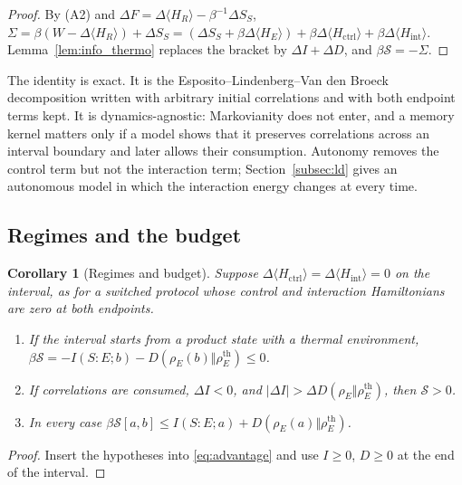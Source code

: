 \documentclass[12pt]{article}
\newtheorem{corollary}[theorem]{Corollary}
\begin{document}
\begin{proof}
By (A2) and $\Delta F=\Delta\langle H_R\rangle-\beta^{-1}\Delta S_S$,
$\Sigma=\beta(W-\Delta\langle H_R\rangle)+\Delta S_S=(\Delta S_S+\beta\Delta\langle H_E\rangle)+\beta\Delta\langle H_{\mathrm{ctrl}}\rangle+\beta\Delta\langle H_{\mathrm{int}}\rangle$. Lemma~\ref{lem:info_thermo} replaces the bracket by $\Delta I+\Delta D$, and $\beta\mathcal S=-\Sigma$.
\end{proof}

The identity is exact. It is the Esposito--Lindenberg--Van den Broeck decomposition \cite{EspositoLindenbergVandenBroeck2010} written with arbitrary initial correlations and with both endpoint terms kept. It is dynamics-agnostic: Markovianity does not enter, and a memory kernel matters only if a model shows that it preserves correlations across an interval boundary and later allows their consumption. Autonomy removes the control term but not the interaction term; Section~\ref{subsec:ld} gives an autonomous model in which the interaction energy changes at every time.

\subsection{Regimes and the budget}

\begin{corollary}[Regimes and budget]
\label{cor:three_regimes}
Suppose $\Delta\langle H_{\mathrm{ctrl}}\rangle=\Delta\langle H_{\mathrm{int}}\rangle=0$ on the interval, as for a switched protocol whose control and interaction Hamiltonians are zero at both endpoints.
\begin{enumerate}
\item If the interval starts from a product state with a thermal environment, $\beta\mathcal S=-I(S{:}E;b)-D(\rho_E(b)\Vert\rho_E^{\mathrm{th}})\le0$.
\item If correlations are consumed, $\Delta I<0$, and $|\Delta I|>\Delta D(\rho_E\Vert\rho_E^{\mathrm{th}})$, then $\mathcal S>0$.
\item In every case $\beta\mathcal S[a,b]\le I(S{:}E;a)+D(\rho_E(a)\Vert\rho_E^{\mathrm{th}})$.
\end{enumerate}
\end{corollary}

\begin{proof}
Insert the hypotheses into \eqref{eq:advantage} and use $I\ge0$, $D\ge0$ at the end of the interval.
\end{proof}
\end{document}
